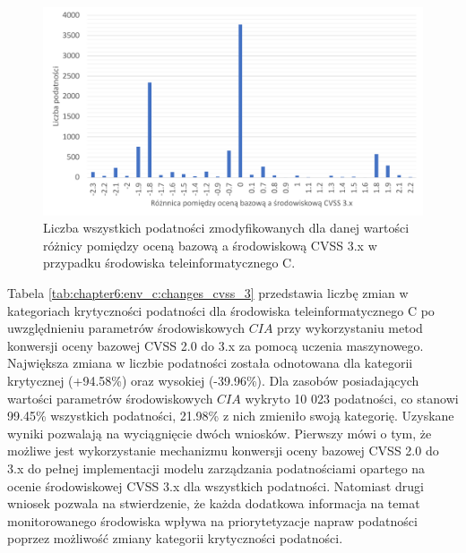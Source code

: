 \begin{figure}[!ht]
\centering
\includegraphics[width=.9\textwidth]{Chapters/Eksperymenty/env_C_results/changes_cvss_3.pdf}
\caption{Liczba wszystkich podatności zmodyfikowanych dla danej wartości różnicy pomiędzy oceną bazową a środowiskową CVSS 3.x w przypadku środowiska teleinformatycznego C.}
\label{fig:chapter6:env_c:cvss_3_changes}
\end{figure}

\bigbreak
Tabela \ref{tab:chapter6:env_c:changes_cvss_3} przedstawia liczbę zmian w kategoriach krytyczności podatności dla środowiska teleinformatycznego C po uwzględnieniu parametrów środowiskowych $CIA$ przy wykorzystaniu metod konwersji oceny bazowej CVSS 2.0 do 3.x za pomocą uczenia maszynowego. Największa zmiana w liczbie podatności została odnotowana dla kategorii krytycznej (+94.58\%) oraz wysokiej (-39.96\%). Dla zasobów posiadających wartości parametrów środowiskowych $CIA$ wykryto 10 023 podatności, co stanowi 99.45\% wszystkich podatności, 21.98\% z nich zmieniło swoją kategorię. Uzyskane wyniki pozwalają na wyciągnięcie dwóch wniosków. Pierwszy mówi o tym, że możliwe jest wykorzystanie mechanizmu konwersji oceny bazowej CVSS 2.0 do 3.x do pełnej implementacji modelu zarządzania podatnościami opartego na ocenie środowiskowej CVSS 3.x dla wszystkich podatności. Natomiast drugi wniosek pozwala na stwierdzenie, że każda dodatkowa informacja na temat monitorowanego środowiska wpływa na priorytetyzacje napraw podatności poprzez możliwość zmiany kategorii krytyczności podatności.

